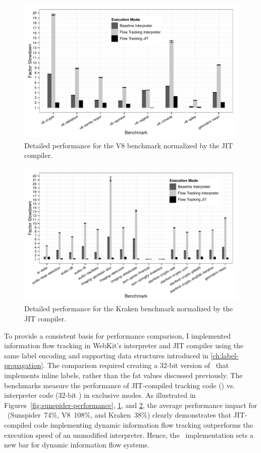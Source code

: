 \begin{figure}[ht]
  \centerline{\includegraphics[width=\linewidth,keepaspectratio=true]{graphics/v8_plot.pdf}}
  \caption{Detailed performance for the V8 benchmark normalized by the  JIT compiler.}
   \label{fig:v8-performance}
\end{figure}

\begin{figure}[ht]
  \centerline{\includegraphics[width=\linewidth,keepaspectratio=true]{graphics/kraken_plot.pdf}}
  \caption{Detailed performance for the Kraken benchmark normalized by the  JIT compiler.}
   \label{fig:kraken-performance}
\end{figure}

To provide a consistent basis for performance comparison, I implemented information flow tracking in WebKit's interpreter and JIT compiler using the same label encoding and supporting data structures introduced in \autoref{ch:label-propagation}.
The comparison required creating a 32-bit version of \FlowCore\ that implements inline labels, rather than the fat values discussed previously.
The benchmarks measure the performance of JIT-compiled tracking code (\JitFlow) vs. interpreter code (32-bit \FlowCore) in exclusive modes.
As illustrated in Figures~\ref{fig:sunspider-performance}, \ref{fig:v8-performance}, and \ref{fig:kraken-performance}, the average performance impact for \JitFlow\ (Sunspider~74\%, V8~108\%, and Kraken~38\%) clearly demonstrates that JIT-compiled code implementing dynamic information flow tracking outperforms the execution speed of an unmodified interpreter.
Hence, the \JitFlow\ implementation sets a new bar for dynamic information flow systems.


